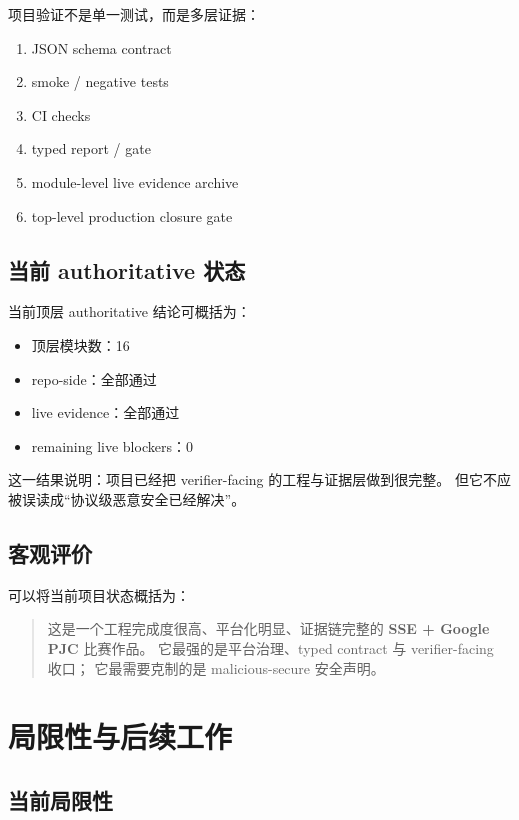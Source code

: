 \documentclass[UTF8,a4paper,12pt,oneside]{ctexrep}
\begin{document}
项目验证不是单一测试，而是多层证据：

\begin{enumerate}
  \item JSON schema contract
  \item smoke / negative tests
  \item CI checks
  \item typed report / gate
  \item module-level live evidence archive
  \item top-level production closure gate
\end{enumerate}

\section{当前 authoritative 状态}

当前顶层 authoritative 结论可概括为：

\begin{itemize}
  \item 顶层模块数：16
  \item repo-side：全部通过
  \item live evidence：全部通过
  \item remaining live blockers：0
\end{itemize}

这一结果说明：项目已经把 verifier-facing 的工程与证据层做到很完整。  
但它不应被误读成“协议级恶意安全已经解决”。

\section{客观评价}

可以将当前项目状态概括为：

\begin{quote}
这是一个工程完成度很高、平台化明显、证据链完整的
\textbf{SSE + Google PJC} 比赛作品。
它最强的是平台治理、typed contract 与 verifier-facing 收口；
它最需要克制的是 malicious-secure 安全声明。
\end{quote}

\chapter{局限性与后续工作}

\section{当前局限性}
\end{document}
